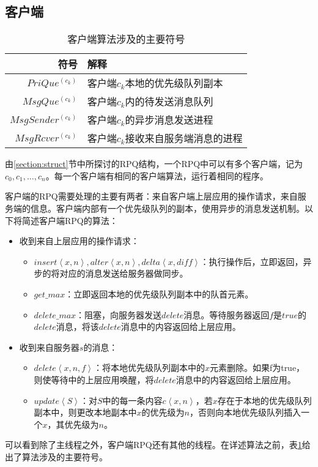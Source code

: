 	\subsection{客户端}
		\begin{table}
			\begin{center}
				\begin{tabular}{r|l}		
					\hline
					符号 & 解释 \\
					\hline\hline
					$PriQue^{(c_{k})}$ & 客户端$c_k$本地的优先级队列副本\\
					$MsgQue^{(c_{k})}$ & 客户端$c_k$内的待发送消息队列\\
					$MsgSender^{(c_{k})}$ & 客户端$c_k$的异步消息发送进程\\
					$MsgRcver^{(c_{k})}$ & 客户端$c_k$接收来自服务端消息的进程\\
					\hline
				\end{tabular}
				\caption{客户端算法涉及的主要符号}
				\label{table:client symble}
			\end{center}
		\end{table}
		\par 由\ref{section:struct}节中所探讨的RPQ结构，一个RPQ中可以有多个客户端，记为$c_{0},c_{1},\ldots,c_{n}$。每一个客户端有相同的客户端算法，运行着相同的程序。
		\par 客户端的RPQ需要处理的主要有两者：来自客户端上层应用的操作请求，来自服务端的信息。客户端内部有一个优先级队列的副本，使用异步的消息发送机制。以下将简述客户端RPQ的算法：
		\begin{itemize}
			\item 收到来自上层应用的操作请求：
			\begin{itemize}
				\item $insert\left\langle x,n\right\rangle ,alter\left\langle x,n\right\rangle ,delta\left\langle x,diff\right\rangle $：执行操作后，立即返回，异步的将对应的消息发送给服务器做同步。
				\item $get\_max$：立即返回本地的优先级队列副本中的队首元素。
				\item $delete\_max$：阻塞，向服务器发送$delete$消息。等待服务器返回$f$是$true$的$delete$消息，将该$delete$消息中的内容返回给上层应用。
			\end{itemize}
			\item 收到来自服务器$s$的消息：
			\begin{itemize}
				\item $delete\left\langle x,n,f\right\rangle $：将本地优先级队列副本中的$x$元素删除。如果f为true，则使等待中的上层应用唤醒，将$delete$消息中的内容返回给上层应用。
				\item $update\left\langle S\right\rangle $：对$S$中的每一条内容$c\left\langle x,n\right\rangle $，若$x$存在于本地的优先级队列副本中，则更改本地副本中$x$的优先级为$n$，否则向本地优先级队列插入一个$x$，其优先级为$n$。
			\end{itemize}
		\end{itemize}
		\par 可以看到除了主线程之外，客户端RPQ还有其他的线程。在详述算法之前，表\ref{table:client symble}给出了算法涉及的主要符号。
